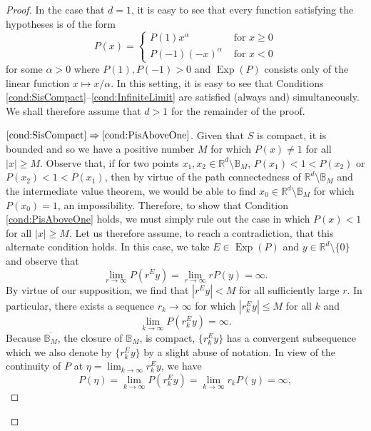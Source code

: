 \documentclass[11pt, letter]{book}
\newcommand*{\myproofname}{Proof}
\newenvironment{subproof}[1][\myproofname]{\begin{proof}[#1]\renewcommand*{\qedsymbol}{$\mathbin{/\mkern-6mu/}$}}{\end{proof}}
\newcommand\Exp{\operatorname{Exp}}
\begin{document}
\begin{proof}
In the case that $d=1$, it is easy to see that every function satisfying the hypotheses is of the form
\begin{equation*}
P(x)=\begin{cases}
P(1)x^\alpha & \mbox{ for }x\geq 0 \\
P(-1)(-x)^\alpha &\mbox{ for }x<0
\end{cases}
\end{equation*}
for some $\alpha>0$ where $P(1),P(-1)>0$ and $\Exp(P)$ consists only of the linear function $x\mapsto x/\alpha$. In this setting, it is easy to see that Conditions \ref{cond:SisCompact}--\ref{cond:InfiniteLimit} are satisfied (always and) simultaneously. We shall therefore assume that $d>1$ for the remainder of the proof.

\begin{subproof}[$\ref{cond:SisCompact}\Rightarrow\ref{cond:PisAboveOne}$]
Given that $S$ is compact, it is bounded and so we have a positive number $M$ for which $P(x)\neq 1$ for all $|x|\geq M$. Observe that, if for two points $x_1,x_2\in \mathbb{R}^d\setminus\mathbb{B}_M$, $P(x_1)<1<P(x_2)$ or $P(x_2)<1<P(x_1)$, then by virtue of the path connectedness of $\mathbb{R}^d\setminus\mathbb{B}_M$ and the intermediate value theorem, we would be able to find  $x_0\in\mathbb{R}^d\setminus\mathbb{B}_M$ for which $P(x_0)=1$, an impossibility. Therefore, to show that Condition \ref{cond:PisAboveOne} holds, we must simply rule out the case in which $P(x)<1$ for all $|x|\geq M$. Let us therefore assume, to reach a contradiction, that this alternate condition holds. In this case, we take $E\in\Exp(P)$ and $y\in\mathbb{R}^d\setminus \{0\}$ and observe that
\begin{equation*}
\lim_{r\to\infty}P(r^Ey)=\lim_{r\to\infty}rP(y)=\infty.
\end{equation*}
By virtue of our supposition, we find that $|r^Ey|<M$ for all sufficiently large $r$. In particular, there exists a sequence $r_k\to\infty$ for which $|r_k^Ey|\leq M$ for all $k$ and 
\begin{equation*}
\lim_{k\to\infty}P(r_k^Ey)=\infty.
\end{equation*}
Because $\overline{\mathbb{B}_M}$, the closure of $\mathbb{B}_M$, is compact, $\{r_k^Ey\}$ has a convergent subsequence which we also denote by $\{r_k^Ey\}$ by a slight abuse of notation. In view of the continuity of $P$ at $\eta=\lim_{k\to\infty}r_k^Ey$, we have
\begin{equation*}
P(\eta)=\lim_{k\to\infty}P(r_k^Ey)=\lim_{k\to\infty}r_kP(y)=\infty,

\end{equation*}
\end{subproof}
\end{proof}
\end{document}
